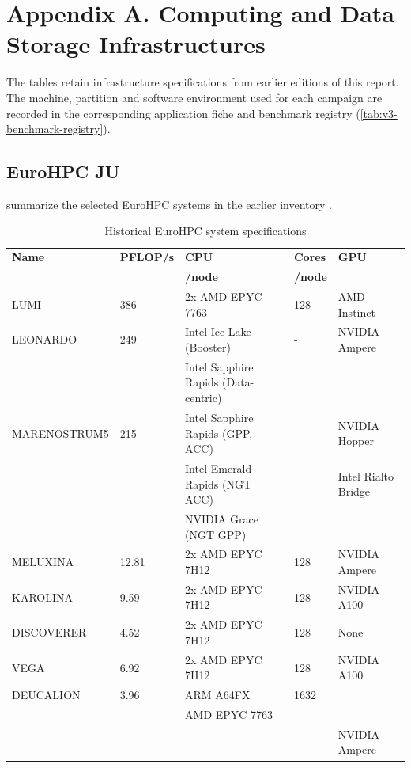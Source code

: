 
\clearpage
\appendix
\section*{Appendix A. Computing and Data Storage Infrastructures}
\label{sec:app:architectures}

The tables retain infrastructure specifications from earlier editions
of this report. The machine, partition and software environment used for
each campaign are recorded in the corresponding application fiche and
benchmark registry (\cref{tab:v3-benchmark-registry}).

\subsection*{EuroHPC JU}
\label{sec:arch:eurohpc-ju}

summarize the selected EuroHPC systems in the earlier inventory
\cite{eurohpc_supercomputers}.

\begin{table}[!ht]
    \centering
    \begin{tabular}{l l l l l}
    \toprule
    \textbf{Name} & \textbf{PFLOP/s} & \textbf{CPU} & \textbf{Cores} & \textbf{GPU} \\
    & & \textbf{/node} & \textbf{/node} & \\
    \midrule
    LUMI  & 386 & 2x AMD EPYC 7763 & 128 & AMD Instinct \\
    LEONARDO  & 249 & Intel Ice-Lake (Booster) & - & NVIDIA Ampere \\
    & & Intel Sapphire Rapids (Data-centric) & & \\
    MARENOSTRUM5 & 215 & Intel Sapphire Rapids (GPP, ACC) & - & NVIDIA Hopper \\
    & & Intel Emerald Rapids (NGT ACC) & & Intel Rialto Bridge\\
    & & NVIDIA Grace (NGT GPP) & & \\
    MELUXINA  & 12.81 & 2x AMD EPYC 7H12 & 128 & NVIDIA Ampere \\
    KAROLINA  & 9.59 & 2x AMD EPYC 7H12 & 128 & NVIDIA A100 \\
    DISCOVERER  & 4.52 & 2x AMD EPYC 7H12 & 128 & None \\
    VEGA  & 6.92 & 2x AMD EPYC 7H12 & 128 & NVIDIA A100 \\
    DEUCALION  & 3.96 & ARM A64FX   & 1632 & \\
    & & AMD EPYC 7763 & & \\
    & & & & NVIDIA Ampere \\
    \bottomrule
    \end{tabular}
    \caption{Historical EuroHPC system specifications}
    \label{tab:eurohpc_flops_cpu_gpu}
\end{table}

